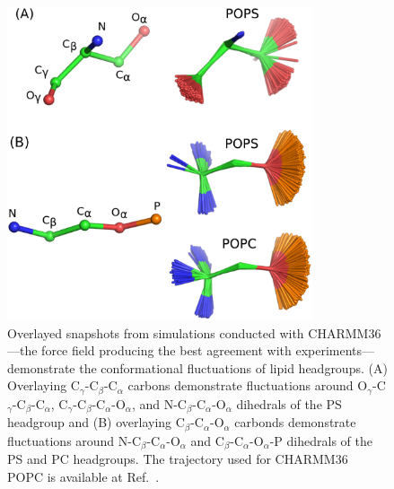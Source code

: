 \documentclass[journal=jpcbfk,manuscript=article]{achemso}
\begin{document}
\begin{figure}[]
  \centering
  \includegraphics[width=9.0cm]{../Figs/structures.eps}
  \caption{\label{HGstructuresPSandPC}
    Overlayed snapshots from simulations conducted with CHARMM36---the force field producing the best agreement with experiments---demonstrate the conformational fluctuations
    of lipid headgroups.
    (A) Overlaying  C$_\gamma$-C$_\beta$-C$_\alpha$ carbons demonstrate fluctuations around O$_\gamma$-C$_\gamma$-C$_\beta$-C$_\alpha$, C$_\gamma$-C$_\beta$-C$_\alpha$-O$_\alpha$,
    and N-C$_\beta$-C$_\alpha$-O$_\alpha$ dihedrals of the PS headgroup and
    (B) overlaying C$_\beta$-C$_\alpha$-O$_\alpha$ carbonds demonstrate fluctuations around N-C$_\beta$-C$_\alpha$-O$_\alpha$ and C$_\beta$-C$_\alpha$-O$_\alpha$-P
    dihedrals of the PS and PC headgroups. The trajectory used for CHARMM36 POPC is available at Ref.~.}
\end{figure}
\end{document}

